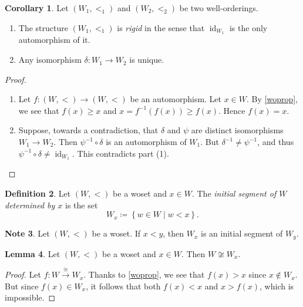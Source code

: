 \documentclass[10pt,letterpaper,cm]{nupset}
\theoremstyle{definition}
\newtheorem{definition}{Definition}[subsection]
\newtheorem{note}[definition]{Note}
\theoremstyle{theorem}
\newtheorem{lemma}[definition]{Lemma}
\newtheorem{corollary}[definition]{Corollary}
\theoremstyle{remark}
\newcommand{\1}{\mathbf{1}}
\newcommand{\0}{\vec 0}
\DeclareMathOperator{\id}{id}
\begin{document}
\begin{corollary} Let $\left(W_1, <_1\right)$ and $\left(W_2, <_2\right)$ be two well-orderings. 
\begin{enumerate}[label=(\arabic*)]
\item The structure $\left(W_1, <_1\right)$ is \textit{rigid} in the sense that $\id_{W_1}$ is the only automorphism of it.
\item Any isomorphism $\delta : W_1 \to W_2$ is unique. 
\end{enumerate}
\end{corollary}
\begin{proof} $ $
\begin{enumerate}[label=(\arabic*)]
\item Let $f: \left(W, <\right) \to \left(W,<\right)$ be an automorphism.  Let $x\in W$. By \cref{woprop}, we see that $f(x)\geq x$ and $x = f^{-1}(f(x))\geq f(x)$. Hence $f(x) =x$.
\item Suppose, towards a contradiction, that $\delta$ and $\psi$ are distinct isomorphisms $ W_1\to W_2$. Then $\psi^{-1} \circ \delta$ is an automorphism of $W_1$. But $\delta^{-1} \ne \psi^{-1}$, and thus $\psi^{-1} \circ \delta \ne \id_{W_1}$. This contradicts part (1). 
\end{enumerate}
\end{proof}

\begin{definition}
Let $\left(W, <\right)$ be a woset and $x\in W$. The \textit{initial segment of $W$ determined by $x$} is the set $$W_x \coloneqq \left\{ w\in W \mid w<x\right\}.$$
\end{definition}

\begin{note}
Let $\left(W, <\right)$ be a woset. If $x<y$, then $W_x$ is an initial segment of $W_y$.
\end{note}

\begin{lemma}\label{non-iso}
Let $\left(W, <\right)$ be a woset and $x\in W$. Then $W\not \cong W_x$.
\end{lemma}
\begin{proof}
Let $f : W \overset{\cong}{\longrightarrow} W_x$. Thanks to \cref{woprop}, we see that $f(x) >x$ since $x\notin W_x$. But since $f(x) \in W_x$, it follows that both $f(x) <x$ and $x>f(x)$, which is impossible. 
\end{proof}
\end{document}
